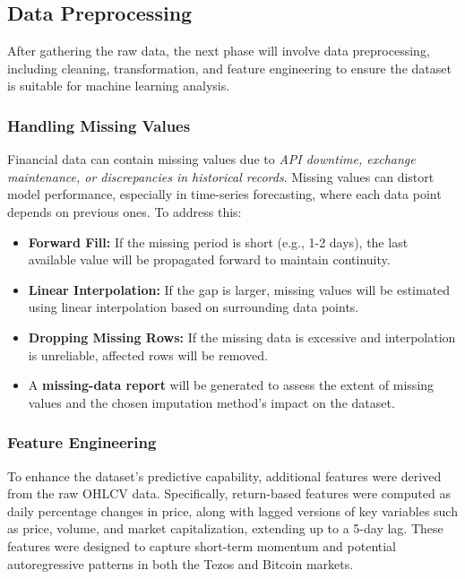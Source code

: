 \subsection{Data Preprocessing}

After gathering the raw data, the next phase will involve data preprocessing, including cleaning, transformation, and feature engineering to ensure the dataset is suitable for machine learning analysis.

\subsubsection{Handling Missing Values}

Financial data can contain missing values due to \textit{API downtime, exchange maintenance, or discrepancies in historical records}. Missing values can distort model performance, especially in time-series forecasting, where each data point depends on previous ones. To address this:

\begin{itemize}
    \item \textbf{Forward Fill:} If the missing period is short (e.g., 1-2 days), the last available value will be propagated forward to maintain continuity.
    \item \textbf{Linear Interpolation:} If the gap is larger, missing values will be estimated using linear interpolation based on surrounding data points.
    \item \textbf{Dropping Missing Rows:} If the missing data is excessive and interpolation is unreliable, affected rows will be removed.
    \item A \textbf{missing-data report} will be generated to assess the extent of missing values and the chosen imputation method's impact on the dataset.
\end{itemize}

\subsubsection{Feature Engineering}

To enhance the dataset's predictive capability, additional features were derived from the raw OHLCV data. Specifically, return-based features were computed as daily percentage changes in price, along with lagged versions of key variables such as price, volume, and market capitalization, extending up to a 5-day lag. These features were designed to capture short-term momentum and potential autoregressive patterns in both the Tezos and Bitcoin markets.

